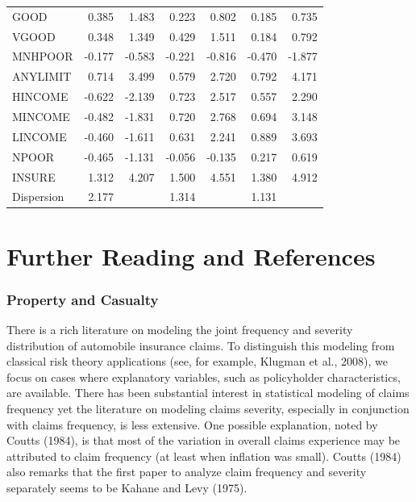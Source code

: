 \begin{table}[h]
\begin{tabular}{l|rr|rrrr}
      GOOD &      0.385 &      1.483 &      0.223 &      0.802 &      0.185 &      0.735 \\
     VGOOD &      0.348 &      1.349 &      0.429 &      1.511 &      0.184 &      0.792 \\
   MNHPOOR &     -0.177 &     -0.583 &     -0.221 &     -0.816 &     -0.470 &     -1.877 \\
  ANYLIMIT &      0.714 &      3.499 &      0.579 &      2.720 &      0.792 &      4.171 \\
  \hline
   HINCOME &     -0.622 &     -2.139 &      0.723 &      2.517 &      0.557 &      2.290 \\
   MINCOME &     -0.482 &     -1.831 &      0.720 &      2.768 &      0.694 &      3.148 \\
   LINCOME &     -0.460 &     -1.611 &      0.631 &      2.241 &      0.889 &      3.693 \\
     NPOOR &     -0.465 &     -1.131 &     -0.056 &     -0.135 &      0.217 &      0.619 \\
    INSURE &      1.312 &      4.207 &      1.500 &      4.551 &      1.380 &      4.912 \\
    \hline
Dispersion &      2.177 &            &      1.314 &            &
1.131 &            \\ \hline
\end{tabular}
 \linetjed
\end{table}



\bigskip


\section{Further Reading and References}

\subsubsection*{Property and Casualty}

There is a rich literature on modeling the joint frequency and
severity distribution of automobile insurance claims. To distinguish
this modeling from classical risk theory applications (see, for
example, Klugman et al., 2008), we focus on cases where explanatory
variables, such as policyholder characteristics, are available.
There has been substantial interest in statistical modeling of
claims frequency yet the literature on modeling claims severity,
especially in conjunction with claims frequency, is less extensive.
One possible explanation, noted by Coutts (1984), is that most of
the variation in overall claims experience may be attributed to
claim frequency (at least when inflation was small). Coutts (1984)
also remarks that the first paper to analyze claim frequency and
severity separately seems to be Kahane and Levy (1975).

